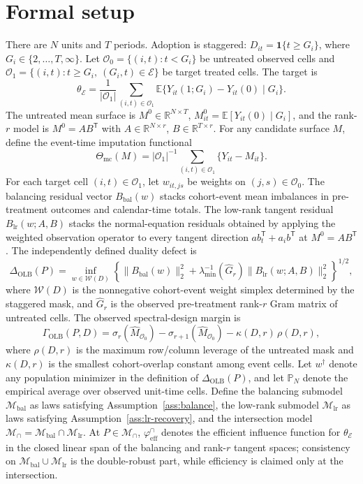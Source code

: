 \documentclass[11pt]{article}
\newcommand{\E}{\mathbb{E}}
\newcommand{\one}{\mathbf{1}}
\newcommand{\transpose}{\mathsf{T}}
\newcommand{\R}{\mathbb{R}}
\theoremstyle{definition}
\theoremstyle{plain}
\theoremstyle{remark}
\begin{document}
\section{Formal setup}
There are \(N\) units and \(T\) periods.  Adoption is staggered: \(D_{it}=\one\{t\ge G_i\}\), where \(G_i\in\{2,\ldots,T,\infty\}\).  Let \(\mathcal{O}_0=\{(i,t):t<G_i\}\) be untreated observed cells and \(\mathcal{O}_1=\{(i,t):t\ge G_i,\ (G_i,t)\in\mathcal{E}\}\) be target treated cells.  The target is
\[
\theta_{\mathcal{E}}=\frac{1}{|\mathcal{O}_1|}\sum_{(i,t)\in\mathcal{O}_1}\E\{Y_{it}(1;G_i)-Y_{it}(0)\mid G_i\}.
\]
The untreated mean surface is \(M^0\in\R^{N\times T}\), \(M^0_{it}=\E[Y_{it}(0)\mid G_i]\), and the rank-\(r\) model is \(M^0=A B^{\transpose}\) with \(A\in\R^{N\times r}\), \(B\in\R^{T\times r}\).  For any candidate surface \(M\), define the event-time imputation functional
\[
\Theta_{\mathrm{mc}}(M)=|\mathcal{O}_1|^{-1}\sum_{(i,t)\in\mathcal{O}_1}\{Y_{it}-M_{it}\}.
\]
For each target cell \((i,t)\in\mathcal{O}_1\), let \(w_{it,js}\) be weights on \((j,s)\in\mathcal{O}_0\).  The balancing residual vector \(B_{\mathrm{bal}}(w)\) stacks cohort-event mean imbalances in pre-treatment outcomes and calendar-time totals.  The low-rank tangent residual \(B_{\mathrm{lr}}(w;A,B)\) stacks the normal-equation residuals obtained by applying the weighted observation operator to every tangent direction \(a b_t^{\transpose}+a_i b^{\transpose}\) at \(M^0=AB^{\transpose}\).  The independently defined duality defect is
\[
\Delta_{\mathrm{OLB}}(P)=
\inf_{w\in\mathcal{W}(D)}
\left\{\|B_{\mathrm{bal}}(w)\|_2^2+
\lambda_{\min}^{-1}(\widehat G_r)\|B_{\mathrm{lr}}(w;A,B)\|_2^2\right\}^{1/2},
\]
where \(\mathcal{W}(D)\) is the nonnegative cohort-event weight simplex determined by the staggered mask, and \(\widehat G_r\) is the observed pre-treatment rank-\(r\) Gram matrix of untreated cells.  The observed spectral-design margin is
\[
\Gamma_{\mathrm{OLB}}(P,D)=
\sigma_r(\widehat M_{\mathcal{O}_0})-\sigma_{r+1}(\widehat M_{\mathcal{O}_0})-\kappa(D,r)\,\rho(D,r),
\]
where \(\rho(D,r)\) is the maximum row/column leverage of the untreated mask and \(\kappa(D,r)\) is the smallest cohort-overlap constant among event cells.
Let \(w^\dagger\) denote any population minimizer in the definition of \(\Delta_{\mathrm{OLB}}(P)\), and let \(\mathbb P_N\) denote the empirical average over observed unit-time cells.  Define the balancing submodel \(\mathcal{M}_{\mathrm{bal}}\) as laws satisfying Assumption~\ref{ass:balance}, the low-rank submodel \(\mathcal{M}_{\mathrm{lr}}\) as laws satisfying Assumption~\ref{ass:lr-recovery}, and the intersection model \(\mathcal{M}_{\cap}=\mathcal{M}_{\mathrm{bal}}\cap\mathcal{M}_{\mathrm{lr}}\).  At \(P\in\mathcal{M}_{\cap}\), \(\varphi_{\mathrm{eff}}^{\cap}\) denotes the efficient influence function for \(\theta_{\mathcal{E}}\) in the closed linear span of the balancing and rank-\(r\) tangent spaces; consistency on \(\mathcal{M}_{\mathrm{bal}}\cup\mathcal{M}_{\mathrm{lr}}\) is the double-robust part, while efficiency is claimed only at the intersection.
\end{document}
